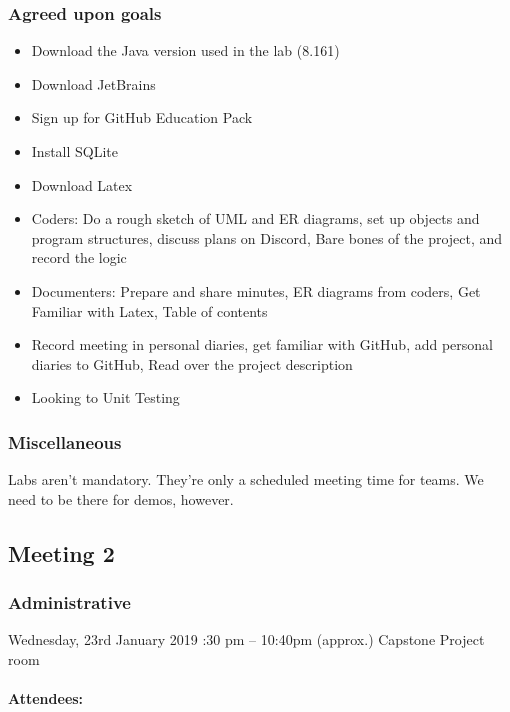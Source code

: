 \documentclass[10pt, a4paper]{article}
\begin{document}
			\subsubsection{Agreed upon goals}
			\begin{itemize}
				\item Download the Java version used in the lab (8.161) 
				\item Download JetBrains 
				\item Sign up for GitHub Education Pack 
				\item Install SQLite 
				\item Download Latex 
				\item Coders: Do a rough sketch of UML and ER diagrams, set up objects and program structures, discuss plans on Discord, Bare bones of the project, and record the logic 
				\item Documenters: Prepare and share minutes, ER diagrams from coders, Get Familiar with Latex, Table of contents 
				\item Record meeting in personal diaries, get familiar with GitHub, add personal diaries to GitHub, Read over the project description 
				\item Looking to Unit Testing 
			\end{itemize}
			
			\subsubsection{Miscellaneous}
			Labs aren’t mandatory. They’re only a scheduled meeting time for teams. We need to be there for demos, however.
			\pagebreak
			
			\subsection{Meeting 2}
			
			\subsubsection{Administrative}
			Wednesday, 23rd January 2019 :30 pm – 10:40pm (approx.) \textbar Capstone Project room 
			\paragraph{Attendees:}
			
\end{document}
